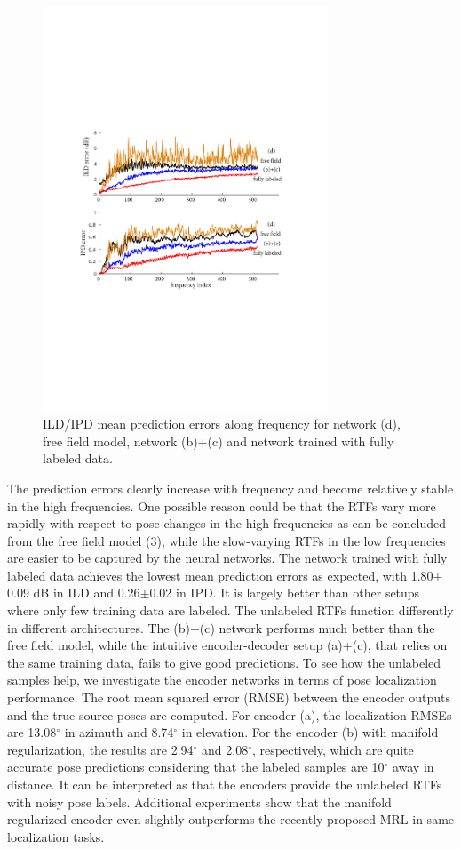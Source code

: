 \documentclass{article}
\begin{document}
\begin{figure}[tb]
    \centering
    \centerline{\includegraphics[width=8.5cm]{fig3_err_freq.pdf}}
    \caption{ILD/IPD mean prediction errors along frequency for network (d), free field model, network (b)+(c) and network trained with fully labeled data.}
    \label{fig3}
\end{figure}

The prediction errors clearly increase with frequency and become relatively stable in the high frequencies. One possible reason could be that the RTFs vary more rapidly with respect to pose changes in the high frequencies as can be concluded from the free field model (3), while the slow-varying RTFs in the low frequencies are easier to be captured by the neural networks. The network trained with fully labeled data achieves the lowest mean prediction errors as expected, with 1.80$\pm$0.09 dB in ILD and 0.26$\pm$0.02 in IPD. It is largely better than other setups where only few training data are labeled. The unlabeled RTFs function differently in different architectures. The (b)+(c) network performs much better than the free field model, while the intuitive encoder-decoder setup (a)+(c), that relies on the same training data, fails to give good predictions. To see how the unlabeled samples help, we investigate the encoder networks in terms of pose localization performance. The root mean squared error (RMSE) between the encoder outputs and the true source poses are computed. For encoder (a), the localization RMSEs are 13.08$^{\circ}$ in azimuth and 8.74$^{\circ}$ in elevation. For the encoder (b) with manifold regularization, the results are 2.94$^{\circ}$ and 2.08$^{\circ}$, respectively, which are quite accurate pose predictions considering that the labeled samples are 10$^{\circ}$ away in distance. It can be interpreted as that the encoders provide the unlabeled RTFs with noisy pose labels. Additional experiments show that the manifold regularized encoder even slightly outperforms the recently proposed MRL in same localization tasks.
\end{document}
